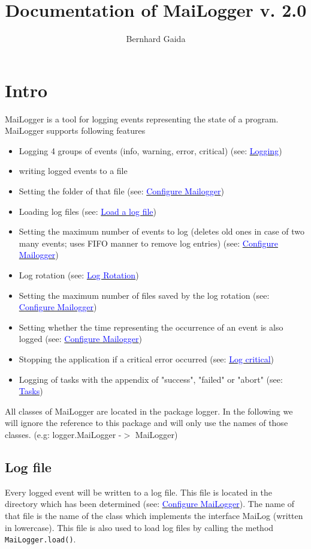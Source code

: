 \documentclass{article}
\title{Documentation of MaiLogger v. 2.0}
\author{Bernhard Gaida}
\newcommand{\refh}[2]{\hyperref[#1] {\textcolor{blue}{#2}}}
\newcommand{\coB}[1]{\textcolor{blue}{#1}}
\begin{document}
\maketitle
\tableofcontents
\pagebreak

\section{Intro}
\label{intro}
    MaiLogger is a tool for logging events representing the state of a program.
    MaiLogger supports following features
    \begin{itemize}
        \item Logging 4 groups of events (info, warning, error, critical) (see: \refh{logging}{Logging})
        \item writing logged events to a file
        \item Setting the folder of that file (see: \hyperref[setup_mailogger.setup]{\coB{Configure Mailogger}})
        \item Loading log files (see: \refh{other_load}{Load a log file})
        \item Setting the maximum number of events to log (deletes old ones in case of two many events; uses FIFO manner to remove log entries) (see: \refh{setup_mailogger.setup}{Configure Mailogger})
        \item Log rotation (see: \refh{rotate}{Log Rotation})
        \item Setting the maximum number of files saved by the log rotation (see: \refh{setup_mailogger.setup}{Configure Mailogger})
        \item Setting whether the time representing the occurrence of an event is also logged (see: \refh{setup_mailogger.setup}{Configure Mailogger})
        \item Stopping the application if a critical error occurred (see: \refh{logging_critical}{Log critical})
        \item Logging of tasks with the appendix of "success", "failed" or "abort" (see: \refh{tasks}{Tasks})
    \end{itemize}
    All classes of MaiLogger are located in the package logger.
    In the following we will ignore the reference to this package and will only use the names of those classes. (e.g: logger.MaiLogger -$>$ MaiLogger)

    \subsection{Log file}
    Every logged event will be written to a log file.
    This file is located in the directory which has been determined (see: \refh{setup_mailogger.setup}{Configure MaiLogger}).
    The name of that file is the name of the class which implements the interface MaiLog (written in lowercase).
    This file is also used to load log files by calling the method \lstinline|MaiLogger.load()|.
\end{document}
